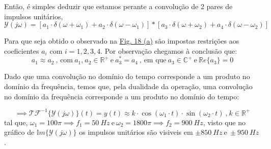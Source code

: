 Então, é simples deduzir que estamos perante a convolução de 2 pares de impulsos unitários,
\[\mathcal{Y}(j\omega) = [a_1 \cdot \delta (\omega + \omega_1) + a_2 \cdot \delta (\omega - \omega_1)] * [ a_3 \cdot \delta (\omega + \omega_2) + a_4 \cdot \delta (\omega - \omega_2)]\]

Para que seja obtido o observado na \hyperref[fig:sistema6_absH]{Fig. 18 (a)} são impostas restrições aos coeficientes \(a_i\) com \(i = 1,2,3,4\). Por observação chegamos à conclusão que:
\[a_1 \approx a_2\ \text{, com}\ a_1\text{,}\ a_2 \in \mathbb{R}^{+}\ \text{e}\ a^{*}_3 = a_{4}\ \text{, em que}\ a_3 \in \mathbb{C}^{+}\ \text{e}\ \mathbb{R}e\{a_3\} = 0 \]

Dado que uma convolução no domínio do tempo corresponde a um produto no domínio da frequência, temos que, pela dualidade da operação, uma convolução no domínio da frequência corresponde a um produto no domínio do tempo:

\[\implies \mathcal{TF}^{-1}\{\mathcal{Y}(j\omega)\}(t) = y(t) \approx k \cdot \cos (\omega_1 \cdot t) \cdot \sin (\omega_2 \cdot t)\ \text{,}\ k \in \mathbb{R}^{+}\]
tal que, \(\omega_1 = 100 \pi \implies f_1 = 50\ Hz\ \text{e}\ \omega_2 = 1800 \pi \implies f_2 = 900\ Hz\), visto que no gráfico de \(\mathbb{I}m\{\mathcal{Y}(j\omega)\}\) os impulsos unitários são visiveis em \(\pm 850\ Hz\ \text{e}\ \pm 950\ Hz\).

